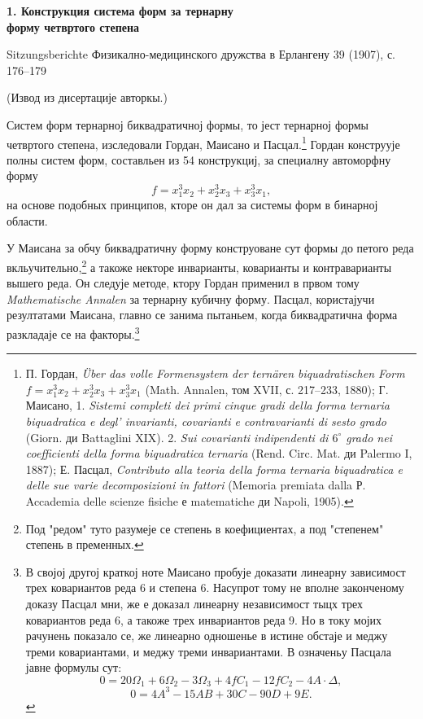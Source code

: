 ﻿\documentclass[11pt]{article}
\begin{document}
\begin{center}
{\Large\bfseries 1. Конструкция система форм за тернарну\\ форму четвртого степена}\par
\vspace{1.5em}
Sitzungsberichte Физикално-медицинского дружства в Ерлангену 39 (1907), с. 176--179
\end{center}

\vspace{4em}
\begin{center}
(Извод из дисертације авторкы.)
\end{center}

Систем форм тернарној биквадратичној формы, то јест тернарној формы четвртого степена, изследовали Гордан, Маисано и Пасцал.\footnote{П. Гордан, \emph{Über das volle Formensystem der ternären biquadratischen Form} $f=x_1^3x_2+x_2^3x_3+x_3^3x_1$ (Math. Annalen, том XVII, с. 217--233, 1880); Г. Маисано, 1. \emph{Sistemi completi dei primi cinque gradi della forma ternaria biquadratica e degl' invarianti, covarianti e contravarianti di sesto grado} (Giorn. ди Battaglini XIX). 2. \emph{Sui covarianti indipendenti di $6^\circ$ grado nei coefficienti della forma biquadratica ternaria} (Rend. Circ. Mat. ди Palermo I, 1887); Е. Пасцал, \emph{Contributo alla teoria della forma ternaria biquadratica e delle sue varie decomposizioni in fattori} (Memoria premiata dalla Р. Accademia delle scienze fisiche е matematiche ди Napoli, 1905).}
Гордан конструује полны систем форм, составльен из 54 конструкциј, за специалну автоморфну форму
\[
f=x_1^3x_2+x_2^3x_3+x_3^3x_1,
\]
на основе подобных принципов, кторе он дал за системы форм в бинарној области.

У Маисана за обчу биквадратичну форму конструоване сут формы до петого реда вкльучительно,\footnote{Под "редом" туто разумеје се степень в коефициентах, а под "степенем" степень в пременных.}
а такоже некторе инварианты, коварианты и контраварианты вышего реда. Он следује методе, ктору Гордан применил в првом тому \emph{Mathematische Annalen} за тернарну кубичну форму. Пасцал, користајучи резултатами Маисана, главно се занима пытаньем, когда биквадратична форма разкладаје се на факторы.\footnote{В својој другој краткој ноте Маисано пробује доказати линеарну зависимост трех ковариантов реда 6 и степена 6. Насупрот тому не вполне законченому доказу Пасцал мни, же е доказал линеарну независимост тыцх трех ковариантов реда 6, а такоже трех инвариантов реда 9. Но в току мојих рачунень показало се, же линеарно одношенье в истине обстаје и меджу треми ковариантами, и меджу треми инвариантами. В означеньу Пасцала јавне формулы сут:
\[
0=20\Omega_1+6\Omega_2-3\Omega_3+4fC_1-12fC_2-4A\cdot\Delta,
\]
\[
0=4A^3-15AB+30C-90D+9E.
\]}
\end{document}
